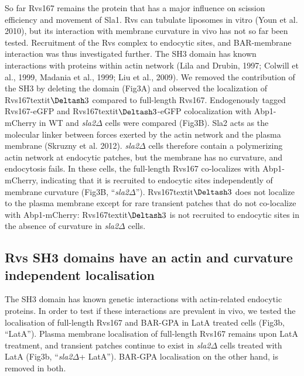 \documentclass[9pt,lineno]{elife}
\begin{document}
So far Rvs167 remains the protein that has a major influence on scission efficiency and movement of Sla1. Rvs can tubulate liposomes in vitro (Youn et al. 2010), but its interaction with membrane curvature in vivo has not so far been tested.  Recruitment of the Rvs complex to endocytic sites, and BAR-membrane interaction was thus investigated further. The SH3 domain has known interactions with proteins within actin network (Lila and Drubin, 1997; Colwill et al., 1999, Madania et al., 1999; Liu et al., 2009). We removed the contribution of the SH3 by deleting the domain (Fig3A) and observed the localization of Rvs167textit{$\Deltash3$} compared to full-length Rvs167. Endogenously tagged Rvs167-eGFP and Rvs167textit{$\Deltash3$}-eGFP colocalization with Abp1-mCherry in WT and \textit{sla2$\Delta$} cells were compared (Fig3B). Sla2 acts as the molecular linker between forces exerted by the actin network and the plasma membrane (Skruzny et al. 2012). \textit{sla2$\Delta$} cells therefore contain a polymerizing actin network at endocytic patches, but the membrane has no curvature, and endocytosis fails. In these cells, the full-length Rvs167 co-localizes with Abp1-mCherry, indicating that it is recruited to endocytic sites independently of membrane curvature (Fig3B, “\textit{sla2$\Delta$}”). Rvs167textit{$\Deltash3$} does not localize to the plasma membrane except for rare transient patches that do not co-localize with Abp1-mCherry: Rvs167textit{$\Deltash3$} is not recruited to endocytic sites in the absence of curvature in \textit{sla2$\Delta$} cells.


\subsection{Rvs SH3 domains have an actin and curvature independent localisation}
The SH3 domain has known genetic interactions with actin-related endocytic proteins. In order to test if these interactions are prevalent in vivo, we tested the localisation of full-length Rvs167 and BAR-GPA in LatA treated cells (Fig3b, “LatA”). Plasma membrane localisation of full-length Rvs167 remains upon LatA treatment, and transient patches continue to exist in \textit{sla2$\Delta$} cells treated with LatA (Fig3b, “\textit{sla2$\Delta$}+ LatA”). BAR-GPA localisation on the other hand, is removed in both. 

\end{document}
